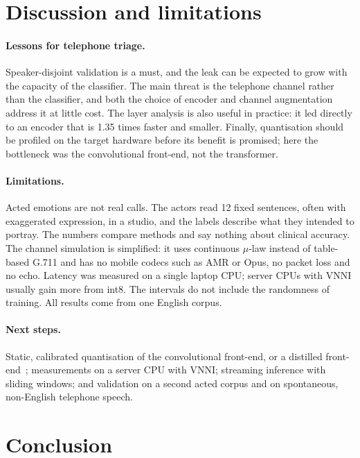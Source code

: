 \documentclass[11pt,a4paper]{article}
\begin{document}
\section{Discussion and limitations}

\paragraph{Lessons for telephone triage.} Speaker-disjoint validation is a must, and the leak can
be expected to grow with the capacity of the classifier. The main threat is the telephone
channel rather than the classifier, and both the choice of encoder and channel augmentation
address it at little cost. The layer analysis is also useful in practice: it led directly to an
encoder that is 1.35 times faster and smaller. Finally, quantisation should be profiled on the
target hardware before its benefit is promised; here the bottleneck was the convolutional
front-end, not the transformer.

\paragraph{Limitations.} Acted emotions are not real calls. The actors read 12 fixed sentences,
often with exaggerated expression, in a studio, and the labels describe what they intended to
portray. The numbers compare methods and say nothing about clinical accuracy. The channel
simulation is simplified: it uses continuous $\mu$-law instead of table-based G.711 and has no
mobile codecs such as AMR or Opus, no packet loss and no echo. Latency was measured on a single
laptop CPU; server CPUs with VNNI usually gain more from int8. The intervals do not include the
randomness of training. All results come from one English corpus.

\paragraph{Next steps.} Static, calibrated quantisation of the convolutional front-end, or a
distilled front-end~\citep{chang2022distilhubert}; measurements on a server CPU with VNNI;
streaming inference with sliding windows; and validation on a second acted corpus and on
spontaneous, non-English telephone speech.

\section{Conclusion}
\end{document}
